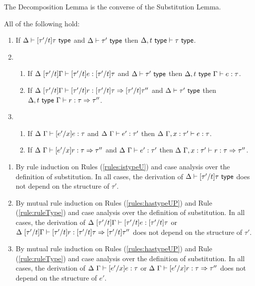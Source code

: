 {{{{The Decomposition Lemma is the converse of the Substitution Lemma.
\begin{lemma}[Decomposition]\label{lemma:decomposition-UP} All of the following hold:
\begin{enumerate}
\item If $\Delta \vdash [\tau'/t]\tau~\mathsf{type}$ and $\Delta \vdash \tau'~\mathsf{type}$ then $\Delta, t~\mathsf{type} \vdash \tau~\mathsf{type}$.
\item \begin{enumerate}
  \item If $\Delta~[\tau'/t]\Gamma \vdash [\tau'/t]e : [\tau'/t]\tau$ and $\Delta \vdash \tau'~\mathsf{type}$ then $\Delta, t~\mathsf{type}~\Gamma \vdash e : \tau$.
  \item If $\Delta~[\tau'/t]\Gamma \vdash [\tau'/t]r : [\tau'/t]\tau \Rightarrow [\tau'/t]\tau''$ and $\Delta \vdash \tau'~\mathsf{type}$ then $\Delta, t~\mathsf{type}~\Gamma \vdash r : \tau \Rightarrow \tau''$.
  \end{enumerate}
\item \begin{enumerate}
  \item If $\Delta~\Gamma \vdash [e'/x]e : \tau$ and $\Delta~\Gamma \vdash e' : \tau'$ then $\Delta~\Gamma, x : \tau' \vdash e : \tau$.
  \item If $\Delta~\Gamma \vdash [e'/x]r : \tau \Rightarrow \tau''$ and $\Delta~\Gamma \vdash e' : \tau'$ then $\Delta~\Gamma, x : \tau' \vdash r : \tau \Rightarrow \tau''$.
  \end{enumerate}
\end{enumerate}\end{lemma}
\begin{proof-sketch}
\begin{enumerate}
\item By rule induction on Rules (\ref{rules:istypeU}) and case analysis over the definition of substitution. In all cases, the derivation of $\Delta \vdash [\tau'/t]\tau~\mathsf{type}$ does not depend on the structure of $\tau'$.
\item By mutual rule induction on Rules (\ref{rules:hastypeUP}) and Rule (\ref{rule:ruleType}) and case analysis over the definition of substitution. In all cases, the derivation of $\Delta~[\tau'/t]\Gamma \vdash [\tau'/t]e : [\tau'/t]\tau$ or $\Delta~[\tau'/t]\Gamma \vdash [\tau'/t]r : [\tau'/t]\tau \Rightarrow [\tau'/t]\tau''$ does not depend on the structure of $\tau'$.
\item By mutual rule induction on Rules (\ref{rules:hastypeUP}) and Rule (\ref{rule:ruleType}) and case analysis over the definition of substitution. In all cases, the derivation of $\Delta~\Gamma \vdash [e'/x]e : \tau$ or $\Delta~\Gamma \vdash [e'/x]r : \tau \Rightarrow \tau''$ does not depend on the structure of $e'$.
\end{enumerate}
\end{proof-sketch}

}}}}
